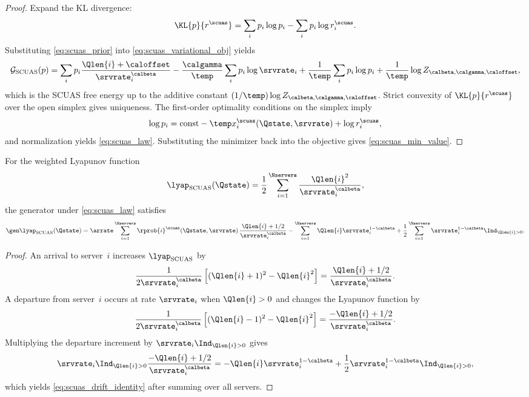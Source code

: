 \begin{proof}
Expand the KL divergence:
\[
\KL{p}{r^{\scuas}}
=
\sum_i p_i \log p_i - \sum_i p_i \log r_i^{\scuas}.
\]
Substituting \eqref{eq:scuas_prior} into \eqref{eq:scuas_variational_obj} yields
\[
\mathcal{G}_{\mathrm{SCUAS}}(p)
=
\sum_i p_i \frac{\Qlen{i}+\caloffset}{\srvrate_i^{\calbeta}}
- \frac{\calgamma}{\temp}\sum_i p_i \log \srvrate_i
+ \frac{1}{\temp}\sum_i p_i \log p_i
+ \frac{1}{\temp}\log Z_{\calbeta,\calgamma,\caloffset},
\]
which is the SCUAS free energy up to the additive constant $(1/\temp)\log Z_{\calbeta,\calgamma,\caloffset}$.
Strict convexity of $\KL{p}{r^{\scuas}}$ over the open simplex gives uniqueness.
The first-order optimality conditions on the simplex imply
\[
\log p_i
=
\mathrm{const}
- \temp x_i^{\scuas}(\Qstate,\srvrate)
+ \log r_i^{\scuas},
\]
and normalization yields \eqref{eq:scuas_law}.
Substituting the minimizer back into the objective gives \eqref{eq:scuas_min_value}.
\end{proof}

\begin{lemma}
\label{lem:scuas_drift}
For the weighted Lyapunov function
\begin{equation}
\label{eq:scuas_lyapunov}
\lyap_{\mathrm{SCUAS}}(\Qstate)
=
\frac12 \sum_{i=1}^{\Nservers} \frac{\Qlen{i}^2}{\srvrate_i^{\calbeta}},
\end{equation}
the generator under \eqref{eq:scuas_law} satisfies
\begin{equation}
\label{eq:scuas_drift_identity}
\gen \lyap_{\mathrm{SCUAS}}(\Qstate)
=
\arrate \sum_{i=1}^{\Nservers} \rprob{i}^{\scuas}(\Qstate,\srvrate)\,
\frac{\Qlen{i}+1/2}{\srvrate_i^{\calbeta}}
- \sum_{i=1}^{\Nservers} \Qlen{i}\srvrate_i^{1-\calbeta}
+ \frac12 \sum_{i=1}^{\Nservers} \srvrate_i^{1-\calbeta}\Ind_{\Qlen{i}>0}.
\end{equation}
\end{lemma}

\begin{proof}
An arrival to server~$i$ increases $\lyap_{\mathrm{SCUAS}}$ by
\[
\frac{1}{2\srvrate_i^{\calbeta}}
\left[(\Qlen{i}+1)^2-\Qlen{i}^2\right]
=
\frac{\Qlen{i}+1/2}{\srvrate_i^{\calbeta}}.
\]
A departure from server~$i$ occurs at rate $\srvrate_i$ when $\Qlen{i}>0$ and changes the Lyapunov function by
\[
\frac{1}{2\srvrate_i^{\calbeta}}
\left[(\Qlen{i}-1)^2-\Qlen{i}^2\right]
=
\frac{-\Qlen{i}+1/2}{\srvrate_i^{\calbeta}}.
\]
Multiplying the departure increment by $\srvrate_i\Ind_{\Qlen{i}>0}$ gives
\[
\srvrate_i\Ind_{\Qlen{i}>0}
\frac{-\Qlen{i}+1/2}{\srvrate_i^{\calbeta}}
=
-\Qlen{i}\srvrate_i^{1-\calbeta}
+ \frac12 \srvrate_i^{1-\calbeta}\Ind_{\Qlen{i}>0},
\]
which yields \eqref{eq:scuas_drift_identity} after summing over all servers.
\end{proof}

